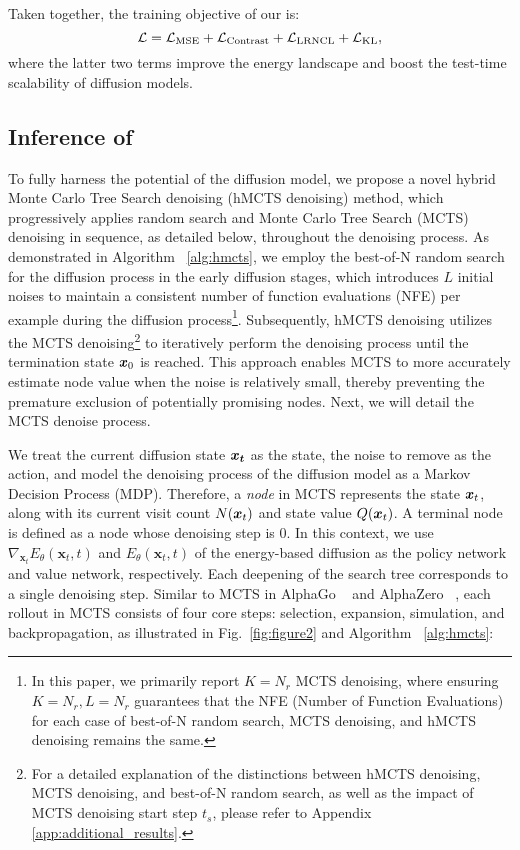 Taken together, the training objective of our \proj is:
\begin{equation}\label{eq:full_objective}
{\mathcal{L}}={\mathcal{L}}_\text{MSE}+{\mathcal{L}}_\text{Contrast}+{\mathcal{L}}_\text{LRNCL}+{\mathcal{L}}_\text{KL},
\end{equation}
where the latter two terms improve the energy landscape and boost the test-time scalability of diffusion models.

% 
\subsection{Inference of \proj}
\label{sec:inference_method}
To fully harness the potential of the diffusion model, we propose a novel hybrid Monte Carlo Tree Search denoising (hMCTS denoising) method, which progressively applies random search and Monte Carlo Tree Search (MCTS) denoising in sequence, as detailed below, throughout the denoising process. As demonstrated in Algorithm ~\ref{alg:hmcts}, we employ the best-of-N random search for the diffusion process in the early diffusion stages, which introduces $L$ initial noises to maintain a consistent number of function evaluations (NFE) per example during the diffusion process\footnote{In this paper, we primarily report $K = N_r$ MCTS denoising, where ensuring $K = N_r, L=N_r$ guarantees that the NFE (Number of Function Evaluations) for each case of best-of-N random search, MCTS denoising, and hMCTS denoising remains the same.}. Subsequently, hMCTS denoising utilizes the MCTS denoising\footnote{For a detailed explanation of the distinctions between hMCTS denoising, MCTS denoising, and best-of-N random search, as well as the impact of MCTS denoising start step \( t_s \), please refer to Appendix \ref{app:additional_results}.} to iteratively perform the denoising process until the termination state \( {\boldsymbol{x}}_0 \) is reached. This approach enables MCTS to more accurately estimate node value when the noise is relatively small, thereby preventing the premature exclusion of potentially promising nodes. Next, we will detail the MCTS denoise process. 

 We treat the current diffusion state \( \boldsymbol{{\boldsymbol{x}}_t} \) as the state, the noise to remove as the action, and model the denoising process of the diffusion model as a Markov Decision Process (MDP). Therefore, a \emph{node} in MCTS represents the state \( {\boldsymbol{x}}_t \), along with its current visit count \( N({\boldsymbol{x}}_t) \) and state value \( Q({\boldsymbol{x}}_t) \). A terminal node is defined as a node whose denoising step is 0. In this context, we use \( \nabla_{\boldsymbol{x}_t} E_\theta(\boldsymbol{x}_t, t) \) and \( E_\theta(\boldsymbol{x}_t, t) \) of the energy-based diffusion as the policy network and value network, respectively. Each deepening of the search tree corresponds to a single denoising step. Similar to MCTS in AlphaGo ~\cite{silver2016mastering} and AlphaZero ~\cite{silver2017mastering}, each rollout in MCTS consists of four core steps: selection, expansion, simulation, and backpropagation, as illustrated in Fig.~\ref{fig:figure2} and Algorithm ~\ref{alg:hmcts}:


